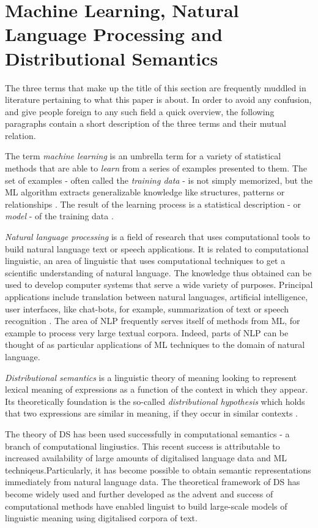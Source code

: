 \documentclass{article}
\begin{document}
\section{Machine Learning, Natural Language Processing and Distributional Semantics}\hypertarget{sec2}{ }
The three terms that make up the title of this section are frequently muddled in literature pertaining to what this paper is about. In order to avoid any confusion, and give people foreign to any such field a quick overview, the following paragraphs contain a short description of the three terms and their mutual relation.
 
The term \emph{machine learning} is an umbrella term for a variety of statistical methods that are able to \emph{learn} from a series of examples presented to them. The set of examples - often called the \emph{training data} - is not simply memorized, but the ML algorithm extracts generalizable knowledge like structures, patterns or relationships \cite{domingos2012few}.
The result of the learning process is a statistical description - or \emph{model} - of the training data \cite{fayyad2001digital}.

\emph{Natural language processing} is a field of research that uses computational tools to build natural language text or speech applications. It is related to computational linguistic, an area of linguistic that uses computational techniques to get a scientific understanding of natural language. The knowledge thus obtained can be used  to develop computer systems that serve a wide variety of purposes. Principal applications include translation between natural languages, artificial intelligence, user interfaces, like chat-bots, for example, summarization of text or speech recognition \cite{chowdhury2003natural}. The area of NLP frequently serves itself of methods from ML, for example to process very large textual corpora. Indeed, parts of NLP can be thought of as particular applications of ML techniques to the domain of natural language.

\emph{Distributional semantics} is a linguistic theory of meaning looking to represent lexical meaning of expressions as a function of the context in which they appear. Its theoretically foundation is the so-called \emph{distributional hypothesis} which holds that two expressions are similar in meaning, if they occur in similar contexts \cite{harris1954distributional}.

The theory of DS has been used successfully in computational semantics - a branch of computational lingiustics. This recent success is attributable to increased availability of large amounts of digitalised language data and ML techniqeus.Particularly, it has become possible to obtain semantic representations immediately from natural language data. The theoretical framework of DS has become widely used and further developed as the advent and success of computational methods have enabled linguist to build large-scale models of linguistic meaning using digitalised corpora of text. 
\end{document}
